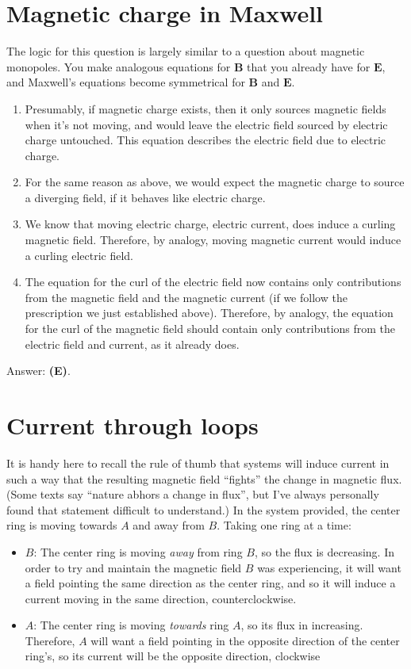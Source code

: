 \documentclass[11pt]{paper}
\newcommand{\answer}[1]{Answer: \textbf{(#1)}.}
\begin{document}
\section{Magnetic charge in Maxwell}
The logic for this question is largely similar to a question about magnetic monopoles.  You make analogous equations for $\mathbf{B}$ that you already have for $\mathbf{E}$, and Maxwell's equations become symmetrical for $\mathbf{B}$ and $\mathbf{E}$.
\begin{enumerate}[label=\Roman*.]
\item Presumably, if magnetic charge exists, then it only sources magnetic fields when it's not moving, and would leave the electric field sourced by electric charge untouched.  This equation describes the electric field due to electric charge.
\item For the same reason as above, we would expect the magnetic charge to source a diverging field, if it behaves like electric charge.
\item We know that moving electric charge, electric current, does induce a curling magnetic field.  Therefore, by analogy, moving magnetic current would induce a curling electric field.
\item The equation for the curl of the electric field now contains only contributions from the magnetic field and the magnetic current (if we follow the prescription we just established above).  Therefore, by analogy, the equation for the curl of the magnetic field should contain only contributions from the electric field and current, as it already does.
\end{enumerate}
\answer{E}

\section{Current through loops}
It is handy here to recall the rule of thumb that systems will induce current in such a way that the resulting magnetic field ``fights'' the change in magnetic flux.  (Some texts say ``nature abhors a change in flux'', but I've always personally found that statement difficult to understand.)  In the system provided, the center ring is moving towards $A$ and away from $B$.  Taking one ring at a time:
\begin{itemize}
\item{$B$}: The center ring is moving \emph{away} from ring $B$, so the flux is decreasing.  In order to try and maintain the magnetic field $B$ was experiencing, it will want a field pointing the same direction as the center ring, and so it will induce a current moving in the same direction, counterclockwise.
\item{$A$}:  The center ring is moving \emph{towards} ring $A$, so its flux in increasing.  Therefore, $A$ will want a field pointing in the opposite direction of the center ring's, so its current will be the opposite direction, clockwise
\end{itemize}
\end{document}
